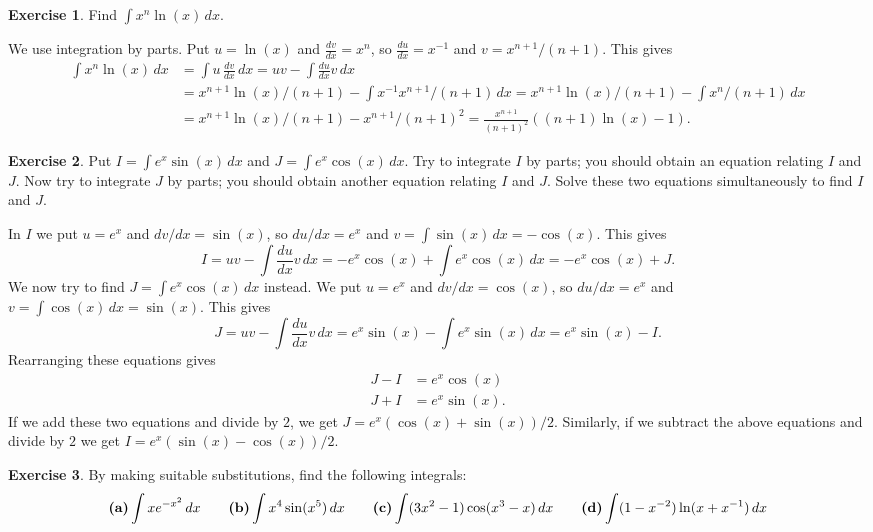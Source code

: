 \documentclass[a4paper]{amsart}
\theoremstyle{definition}
\newtheorem{exercise}{Exercise}[section]
\newenvironment{solution}{{\noindent \bf Solution:}}{}
\begin{document}
\begin{exercise}\label{ex-int-poly-log}
Find $\int x^n\ln(x)\,dx$.
\end{exercise}
\begin{solution}
We use integration by parts.  Put $u=\ln(x)$ and
 $\frac{dv}{dx}=x^n$, so $\frac{du}{dx}=x^{-1}$ and $v=x^{n+1}/(n+1)$.
 This gives 
 \begin{align*}
  \int x^n\ln(x)\,dx &=
   \int u\,\tfrac{dv}{dx}\, dx = uv-\int \tfrac{du}{dx}v\, dx \\
  &= x^{n+1}\ln(x)/(n+1) - 
     \int x^{-1} x^{n+1}/(n+1)\,dx 
   = x^{n+1}\ln(x)/(n+1) - \int x^n/(n+1)\,dx \\
  &= x^{n+1}\ln(x)/(n+1) - x^{n+1}/(n+1)^2 
   = \frac{x^{n+1}}{(n+1)^2}\left((n+1)\ln(x) - 1\right).
 \end{align*}
\end{solution}
\begin{exercise}\label{ex-int-parts-iii}
Put $I=\int e^x\sin(x)\,dx$ and $J=\int e^x\cos(x)\,dx$.
 Try to integrate $I$ by parts; you should obtain an
 equation relating $I$ and $J$.  Now try to integrate $J$ by
 parts; you should obtain another equation relating $I$ and
 $J$.  Solve these two equations simultaneously to find $I$
 and $J$.
\end{exercise}
\begin{solution}
In $I$ we put $u=e^x$ and $dv/dx=\sin(x)$, so $du/dx=e^x$
 and $v=\int\sin(x)\,dx=-\cos(x)$.  This gives
 \[ I = uv - \int \frac{du}{dx}v\,dx 
      = -e^x\cos(x)+\int e^x\cos(x)\, dx 
      = -e^x\cos(x) + J.
 \]
 We now try to find $J=\int e^x\cos(x)\,dx$ instead.  We put
 $u=e^x$ and $dv/dx=\cos(x)$, so $du/dx=e^x$ and
 $v=\int\cos(x)\,dx=\sin(x)$.  This gives
 \[ J = uv - \int \frac{du}{dx}v\,dx 
      = e^x\sin(x)-\int e^x\sin(x)\, dx 
      = e^x\sin(x) - I.
 \]
 Rearranging these equations gives
 \begin{align*}
  J - I &= e^x\cos(x) \\
  J + I &= e^x\sin(x).
 \end{align*}
 If we add these two equations and divide by $2$, we get
 $J=e^x(\cos(x)+\sin(x))/2$.  Similarly, if we subtract the
 above equations and divide by $2$ we get
 $I=e^x(\sin(x)-\cos(x))/2$.
\end{solution}
\begin{exercise}\label{ex-int-subs-viii}
By making suitable substitutions, find the following
 integrals: 
 \[ \text{\textbf{(a)}} \int x e^{-x^2}\,dx \hspace{2em}
    \text{\textbf{(b)}} \int x^4\sin(x^5)\,dx \hspace{2em}
    \text{\textbf{(c)}} \int (3x^2-1)\cos(x^3-x)\,dx \hspace{2em}
    \text{\textbf{(d)}} \int (1-x^{-2})\ln(x+x^{-1})\,dx
 \]
\end{exercise}
\end{document}
